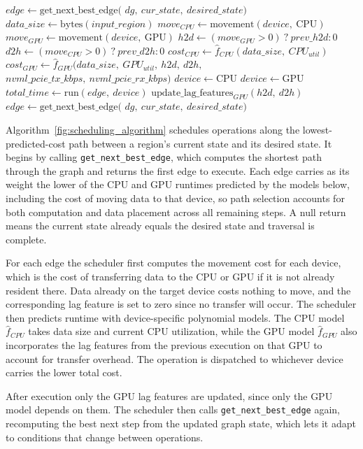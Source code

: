 \begin{algorithm}[t]
\caption{Dynamic scheduling algorithm.}
\label{fig:scheduling_algorithm}
\begin{algorithmic}[1]
\STATE $edge \gets \text{get\_next\_best\_edge}($
\STATE \hspace{2em} $dg,\ cur\_state,\ desired\_state)$
    \STATE $data\_size \gets \text{bytes}(input\_region)$
    \STATE $move_{CPU} \gets \text{movement}(device,\ \text{CPU})$
    \STATE $move_{GPU} \gets \text{movement}(device,\ \text{GPU})$
    \STATE $h2d \gets (move_{GPU} > 0)\ ?\ prev\_h2d : 0$
    \STATE $d2h \gets (move_{CPU} > 0)\ ?\ prev\_d2h : 0$
    \STATE $cost_{CPU} \gets \hat{f}_{CPU}(data\_size,\ CPU_{util})$
    \STATE $cost_{GPU} \gets \hat{f}_{GPU}(data\_size,\ GPU_{util},\ h2d,\ d2h,$
    \STATE \hspace{2em} $nvml\_pcie\_tx\_kbps,\ nvml\_pcie\_rx\_kbps)$
        \STATE $device \gets \text{CPU}$
    \ELSE
        \STATE $device \gets \text{GPU}$
    \ENDIF
    \STATE $total\_time \gets \text{run}(edge,\ device)$
        \STATE $\text{update\_lag\_features}_{GPU}(h2d,\ d2h)$
    \ENDIF
    \STATE $edge \gets \text{get\_next\_best\_edge}($
    \STATE \hspace{2em} $dg,\ cur\_state,\ desired\_state)$
\ENDWHILE
\end{algorithmic}
\end{algorithm}

Algorithm~\ref{fig:scheduling_algorithm} schedules operations along the
lowest-predicted-cost path between a region's current state and its desired
state. It begins by calling \texttt{get\_next\_best\_edge}, which computes
the shortest path through the graph and returns the first edge to execute.
Each edge carries as its weight the lower of the CPU and GPU runtimes
predicted by the models below, including the cost of moving data to that
device, so path selection accounts for both computation and data placement
across all remaining steps. A null return means the current state already
equals the desired state and traversal is complete.

For each edge the scheduler first computes the movement cost for each
device, which is the cost of transferring data to the CPU or GPU if it is
not already resident there. Data already on the target device costs
nothing to move, and the corresponding lag feature is set to zero since no
transfer will occur. The scheduler then predicts runtime with
device-specific polynomial models. The CPU model $\hat{f}_{CPU}$ takes data
size and current CPU utilization, while the GPU model $\hat{f}_{GPU}$ also
incorporates the lag features from the previous execution on that GPU to
account for transfer overhead. The operation is dispatched to whichever
device carries the lower total cost.

After execution only the GPU lag features are updated, since only the GPU
model depends on them. The scheduler then calls
\texttt{get\_next\_best\_edge} again, recomputing the best next step from
the updated graph state, which lets it adapt to conditions that change
between operations.